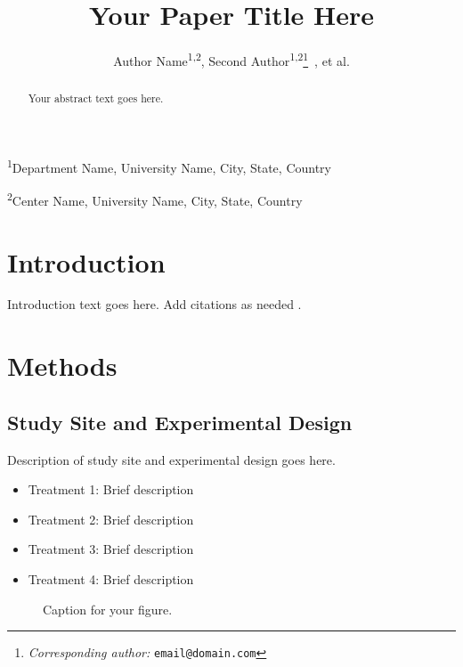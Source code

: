\documentclass[12pt]{article}
\begin{document}
\title{Your Paper Title Here}
\author{%
  Author Name\textsuperscript{1,2},
  Second Author\textsuperscript{1,2}\thanks{\textit{Corresponding author:} \texttt{email@domain.com}}~,
  et al.
}
\date{\vspace{-1em}} %
\maketitle

\noindent
\textsuperscript{1}Department Name, University Name, City, State, Country

\noindent
\textsuperscript{2}Center Name, University Name, City, State, Country

\vspace{1em}
\begin{abstract}
Your abstract text goes here.
\end{abstract}

\section{Introduction}

\noindent
Introduction text goes here. Add citations as needed \cite{reference1}.

\section{Methods}

\subsection{Study Site and Experimental Design}
\label{sec:study-site}

Description of study site and experimental design goes here.

\begin{itemize}
    \item Treatment 1: Brief description
    \item Treatment 2: Brief description
    \item Treatment 3: Brief description
    \item Treatment 4: Brief description
\end{itemize}

\begin{figure}[htbp]
    \centering
    \caption{Caption for your figure.}
    \label{fig:experimental-layout}
\end{figure}
\end{document}
